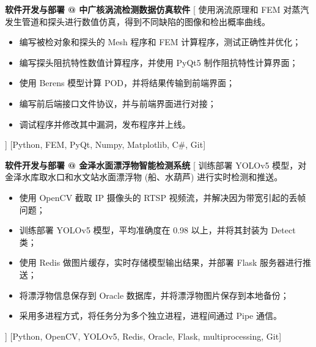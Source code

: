 \documentclass[zh]{resume}
\begin{document}
\begin{experiences}
    {\textbf{软件开发与部署 @ 中广核涡流检测数据仿真软件}}%
    [
    使用涡流原理和 FEM 对蒸汽发生管道和探头进行数值仿真，得到不同缺陷的图像和检出概率曲线。
        \begin{itemize}
            \item {编写被检对象和探头的 Mesh 程序和 FEM 计算程序，测试正确性并优化；}
            \item {编写探头阻抗特性数值计算程序，并使用 PyQt5 制作阻抗特性计算界面；}
            \item {使用 Berens 模型计算 POD，并将结果传输到前端界面；}
            \item {编写前后端接口文件协议，并与前端界面进行对接；}
            \item {调试程序并修改其中漏洞，发布程序并上线。}
        \end{itemize}
    ]
    [Python, FEM, PyQt, Numpy, Matplotlib, C\#, Git]
    \separator{0.5ex}

    {\textbf{软件开发与部署 @ 金泽水面漂浮物智能检测系统}}%
    [
    训练部署 YOLOv5 模型，对金泽水库取水口和水文站水面漂浮物 (船、水葫芦) 进行实时检测和推送。
        \begin{itemize}
            \item {使用 OpenCV 截取 IP 摄像头的 RTSP 视频流，并解决因为带宽引起的丢帧问题；}
            \item {训练部署 YOLOv5 模型，平均准确度在 0.98 以上，并将其封装为 Detect 类；}
            \item {使用 Redis 做图片缓存，实时存储模型输出结果，并部署 Flask 服务器进行推送；}
            \item {将漂浮物信息保存到 Oracle 数据库，并将漂浮物图片保存到本地备份；}
            \item {采用多进程方式，将任务分为多个独立进程，进程间通过 Pipe 通信。}
        \end{itemize}]
    [Python, OpenCV, YOLOv5, Redis, Oracle, Flask, multiprocessing, Git]
\end{experiences}
\end{document}
